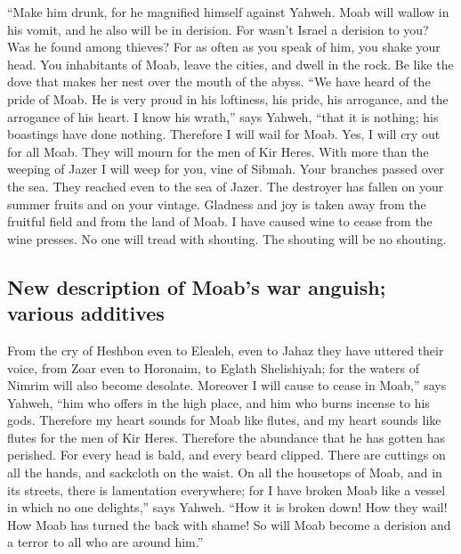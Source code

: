  ``Make him drunk, for he magnified himself against
Yahweh. Moab will wallow in his vomit, and he also will be in derision.
 For wasn't Israel a derision to you? Was he found among
thieves? For as often as you speak of him, you shake your head.
 You inhabitants of Moab, leave the cities, and dwell in
the rock. Be like the dove that makes her nest over the mouth of the
abyss.  ``We have heard of the pride of Moab. He is very
proud in his loftiness, his pride, his arrogance, and the arrogance of
his heart.  I know his wrath,'' says Yahweh, ``that it is
nothing; his boastings have done nothing.  Therefore I
will wail for Moab. Yes, I will cry out for all Moab. They will mourn
for the men of Kir Heres.  With more than the weeping of
Jazer I will weep for you, vine of Sibmah. Your branches passed over the
sea. They reached even to the sea of Jazer. The destroyer has fallen on
your summer fruits and on your vintage.  Gladness and joy
is taken away from the fruitful field and from the land of Moab. I have
caused wine to cease from the wine presses. No one will tread with
shouting. The shouting will be no shouting.

\hypertarget{new-description-of-moabs-war-anguish-various-additives}{%
\subsection{New description of Moab's war anguish; various
additives}\label{new-description-of-moabs-war-anguish-various-additives}}

 From the cry of Heshbon even to Elealeh, even to Jahaz
they have uttered their voice, from Zoar even to Horonaim, to Eglath
Shelishiyah; for the waters of Nimrim will also become desolate.
 Moreover I will cause to cease in Moab,'' says Yahweh,
``him who offers in the high place, and him who burns incense to his
gods.  Therefore my heart sounds for Moab like flutes,
and my heart sounds like flutes for the men of Kir Heres. Therefore the
abundance that he has gotten has perished.  For every
head is bald, and every beard clipped. There are cuttings on all the
hands, and sackcloth on the waist.  On all the housetops
of Moab, and in its streets, there is lamentation everywhere; for I have
broken Moab like a vessel in which no one delights,'' says Yahweh.
 ``How it is broken down! How they wail! How Moab has
turned the back with shame! So will Moab become a derision and a terror
to all who are around him.''

